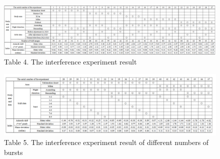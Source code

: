 \documentclass[a4paper,fleqn]{cas-dc}
\begin{document}
\begin{figure}
	\centering 
	\includegraphics[width=1.3\textwidth, angle=-90]{figure/9.png}	
	\caption{Table 4. The interference experiment result} 
	\label{fig_9}
\end{figure}

\begin{figure}
	\centering 
	\includegraphics[width=1.3\textwidth, angle=-90]{figure/10.png}	
	\caption{Table 5. The interference experiment result of different numbers of bursts} 
	\label{fig_9}
\end{figure}
\printcredits

%




\bio{}
\endbio

\endbio
\end{document}
